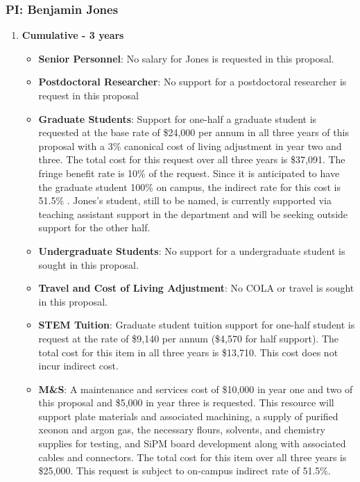 \newpage

\subsubsection{\bf PI: Benjamin Jones}

\begin{enumerate}

\item[]{\textbf{Cumulative - 3 years}}

\begin{itemize}[noitemsep,nolistsep]
\item{{\bf Senior Personnel}: No salary for Jones is requested in this proposal.}

\item {{\bf Postdoctoral Researcher}: No support for a postdoctoral researcher is request in this proposal } 

\item{{\bf Graduate Students}: Support for one-half a graduate student is requested at the base rate of \$24,000 per annum in all three years of this proposal with a 3\% canonical cost of living adjustment in year two and three. The total cost for this request over all three years is \$37,091.  The fringe benefit rate is 10\% of the request.  Since it is anticipated to have the graduate student 100\% on campus, the indirect rate for this cost is 51.5\% . Jones's student, still to be named, is currently supported via teaching assistant support in the department and will be seeking outside support for the other half. }

\item {{\bf Undergraduate Students}: No support for a undergraduate student is sought in this proposal.}

\item{{\bf Travel and Cost of Living Adjustment}: No COLA or travel is sought in this proposal.}

\item {{\bf STEM Tuition}: Graduate student tuition support for one-half student is request at the rate of \$9,140 per annum (\$4,570 for half support). The total cost for this item in all three years is \$13,710.  This cost does not incur indirect cost.}

\item {{\bf M\&S}: A maintenance and services cost of \$10,000 in year one and two of this proposal and \$5,000 in year three is requested. This resource will support plate materials and associated machining, a supply of purified xeonon and argon gas, the necessary flours, solvents, and chemistry supplies for testing, and SiPM board development along with associated cables and connectors. The total cost for this item over all three years is \$25,000.  This request is subject to on-campus indirect rate of 51.5\%.}


\end{itemize}
\end{enumerate}
